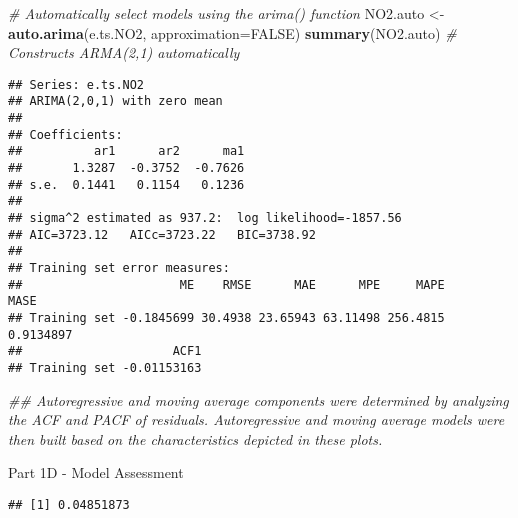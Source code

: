 \documentclass[
]{article}
\newenvironment{Shaded}{\begin{snugshade}}{\end{snugshade}}
\newcommand{\CommentTok}[1]{\textcolor[rgb]{0.56,0.35,0.01}{\textit{#1}}}
\newcommand{\DataTypeTok}[1]{\textcolor[rgb]{0.13,0.29,0.53}{#1}}
\newcommand{\KeywordTok}[1]{\textcolor[rgb]{0.13,0.29,0.53}{\textbf{#1}}}
\newcommand{\NormalTok}[1]{#1}
\newcommand{\OperatorTok}[1]{\textcolor[rgb]{0.81,0.36,0.00}{\textbf{#1}}}
\newcommand{\OtherTok}[1]{\textcolor[rgb]{0.56,0.35,0.01}{#1}}
\newcommand{\StringTok}[1]{\textcolor[rgb]{0.31,0.60,0.02}{#1}}
\begin{document}
\begin{Shaded}
\begin{Highlighting}[]
\CommentTok{# Automatically select models using the arima() function}
\NormalTok{NO2.auto <-}\StringTok{ }\KeywordTok{auto.arima}\NormalTok{(e.ts.NO2, }\DataTypeTok{approximation=}\OtherTok{FALSE}\NormalTok{)}
\KeywordTok{summary}\NormalTok{(NO2.auto) }\CommentTok{# Constructs ARMA(2,1) automatically}
\end{Highlighting}
\end{Shaded}

\begin{verbatim}
## Series: e.ts.NO2 
## ARIMA(2,0,1) with zero mean 
## 
## Coefficients:
##          ar1      ar2      ma1
##       1.3287  -0.3752  -0.7626
## s.e.  0.1441   0.1154   0.1236
## 
## sigma^2 estimated as 937.2:  log likelihood=-1857.56
## AIC=3723.12   AICc=3723.22   BIC=3738.92
## 
## Training set error measures:
##                      ME    RMSE      MAE      MPE     MAPE      MASE
## Training set -0.1845699 30.4938 23.65943 63.11498 256.4815 0.9134897
##                     ACF1
## Training set -0.01153163
\end{verbatim}

\begin{Shaded}
\begin{Highlighting}[]
\CommentTok{## Autoregressive and moving average components were determined by analyzing the ACF and PACF of residuals. Autoregressive and moving average models were then built based on the characteristics depicted in these plots.}
\end{Highlighting}
\end{Shaded}

Part 1D - Model Assessment

\begin{Shaded}
\end{Shaded}

\begin{verbatim}
## [1] 0.04851873
\end{verbatim}

\begin{Shaded}
\end{Shaded}
\end{document}
